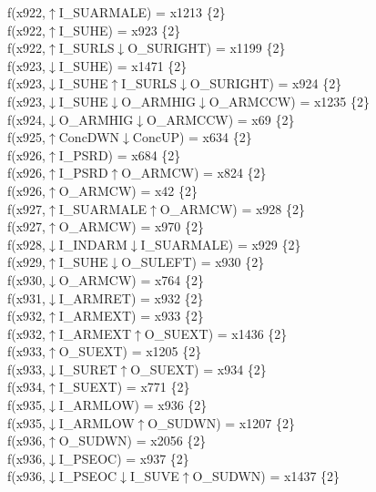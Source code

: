f(x922,$\uparrow$I\_SUARMALE) = x1213 \{2\} \\  
f(x922,$\uparrow$I\_SUHE) = x923 \{2\} \\  
f(x922,$\uparrow$I\_SURLS$\downarrow$O\_SURIGHT) = x1199 \{2\} \\  
f(x923,$\downarrow$I\_SUHE) = x1471 \{2\} \\  
f(x923,$\downarrow$I\_SUHE$\uparrow$I\_SURLS$\downarrow$O\_SURIGHT) = x924 \{2\} \\  
f(x923,$\downarrow$I\_SUHE$\downarrow$O\_ARMHIG$\downarrow$O\_ARMCCW) = x1235 \{2\} \\  
f(x924,$\downarrow$O\_ARMHIG$\downarrow$O\_ARMCCW) = x69 \{2\} \\  
f(x925,$\uparrow$ConcDWN$\downarrow$ConcUP) = x634 \{2\} \\  
f(x926,$\uparrow$I\_PSRD) = x684 \{2\} \\  
f(x926,$\uparrow$I\_PSRD$\uparrow$O\_ARMCW) = x824 \{2\} \\  
f(x926,$\uparrow$O\_ARMCW) = x42 \{2\} \\  
f(x927,$\uparrow$I\_SUARMALE$\uparrow$O\_ARMCW) = x928 \{2\} \\  
f(x927,$\uparrow$O\_ARMCW) = x970 \{2\} \\  
f(x928,$\downarrow$I\_INDARM$\downarrow$I\_SUARMALE) = x929 \{2\} \\  
f(x929,$\uparrow$I\_SUHE$\downarrow$O\_SULEFT) = x930 \{2\} \\  
f(x930,$\downarrow$O\_ARMCW) = x764 \{2\} \\  
f(x931,$\downarrow$I\_ARMRET) = x932 \{2\} \\  
f(x932,$\uparrow$I\_ARMEXT) = x933 \{2\} \\  
f(x932,$\uparrow$I\_ARMEXT$\uparrow$O\_SUEXT) = x1436 \{2\} \\  
f(x933,$\uparrow$O\_SUEXT) = x1205 \{2\} \\  
f(x933,$\downarrow$I\_SURET$\uparrow$O\_SUEXT) = x934 \{2\} \\  
f(x934,$\uparrow$I\_SUEXT) = x771 \{2\} \\  
f(x935,$\downarrow$I\_ARMLOW) = x936 \{2\} \\  
f(x935,$\downarrow$I\_ARMLOW$\uparrow$O\_SUDWN) = x1207 \{2\} \\  
f(x936,$\uparrow$O\_SUDWN) = x2056 \{2\} \\  
f(x936,$\downarrow$I\_PSEOC) = x937 \{2\} \\  
f(x936,$\downarrow$I\_PSEOC$\downarrow$I\_SUVE$\uparrow$O\_SUDWN) = x1437 \{2\} \\  
